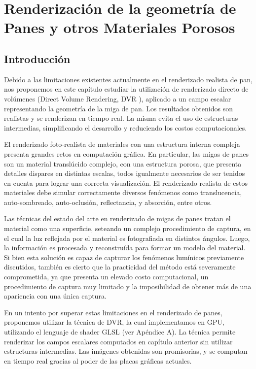 
\chapter[Renderización de la geometría de Panes]{Renderización de la geometría de Panes y otros Materiales Porosos}
\section{Introducción}
Debido a las limitaciones existentes actualmente en el renderizado realista de pan, nos proponemos en este capítulo estudiar la utilización de renderizado directo de volúmenes (Direct Volume Rendering, \acrshort{DVR} \cite{Kratz2006}), aplicado a un campo escalar representando la geometría de la miga de pan. 
Los resultados obtenidos son realistas y se renderizan en tiempo real. La misma evita el uso de estructuras intermedias, simplificando el desarrollo y reduciendo los costos computacionales.

El renderizado foto-realísta de materiales con una estructura interna compleja presenta grandes retos en computación gráfica.
En particular, las migas de panes son un material translúcido complejo, con una estructura porosa, que presenta detalles dispares en distintas escalas, todos igualmente necesarios de ser tenidos en cuenta para lograr una correcta visualización.
El renderizado realista de estos materiales debe simular correctamente diversos fenómenos como translucencia, auto-sombreado, auto-oclusión, reflectancia, y absorción, entre otros.

Las técnicas del estado del arte en renderizado de migas de panes tratan el material como una superficie, seteando un complejo procedimiento de captura, en el cual la luz reflejada por el material es fotografiada en distintos ángulos.
Luego, la información es procesada y reconstruída para formar un modelo del material.
Si bien esta solución es capaz de capturar los fenómenos lumínicos previamente discutidos, también es cierto que la practicidad del método está severamente comprometida, ya que presenta un elevado costo computacional, un procedimiento de captura muy limitado y la imposibilidad de obtener más de una apariencia con una única captura.

En un intento por superar estas limitaciones en el renderizado de panes, proponemos utilizar la técnica de DVR, la cual implementamos en \acrshort{GPU}, utilizando el lenguaje de shader GLSL (ver Apéndice A).
La técnica permite renderizar los campos escalares computados en capítulo anterior sin utilizar estructuras intermedias.
Las imágenes obtenidas son promisorias, y se computan en tiempo real gracias al poder de las placas gráficas actuales.

